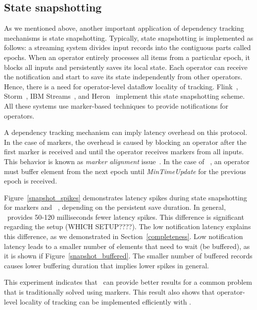 \subsection{State snapshotting} \label{snapshotting}

As we mentioned above, another important application of dependency tracking mechanisms is state snapshotting. Typically, state snapshotting is implemented as follows: a streaming system divides input records into the contiguous  parts called epochs. When an operator entirely processes all items from a particular epoch, it blocks all inputs and persistently saves its local state. Each operator can receive the notification and start to save its state independently from other operators. Hence, there is a need for operator-level dataflow locality of tracking. Flink~\cite{Carbone:2017:SMA:3137765.3137777}, Storm~\cite{apache:storm:state}, IBM Streams~\cite{jacques2016consistent}, and Heron~\cite{Kulkarni:2015:THS:2723372.2742788} implement this state snapshotting scheme. All these systems use marker-based techniques to provide notifications for operators.

A dependency tracking mechanism can imply latency overhead on this protocol. In the case of markers, the overhead is caused by blocking an operator after the first marker is received and until the operator receives markers from all inputs. This behavior is known as {\em marker alignment} issue~\cite{Carbone:2017:SMA:3137765.3137777}. In the case of \tracker\ , an operator must buffer element from the next epoch until {\em MinTimeUpdate} for the previous epoch is received.

Figure~\ref{snapshot_spikes} demonstrates latency spikes during state snapshotting for markers and \tracker\ , depending on the persistent save duration. In general, \tracker\ provides 50-120 milliseconds fewer latency spikes. This difference is significant regarding the setup (WHICH SETUP????). The low notification latency explains this difference, as we demonstrated in Section~\ref{completeness}. Low notification latency leads to a smaller number of elements that need to wait (be buffered), as it is shown if Figure~\ref{snapshot_buffered}. The smaller number of buffered records causes lower buffering duration that implies lower spikes in general.

This experiment indicates that \tracker\ can provide better results for a common problem that is traditionally solved using markers. This result also shows that operator-level locality of tracking can be implemented efficiently with \tracker .

